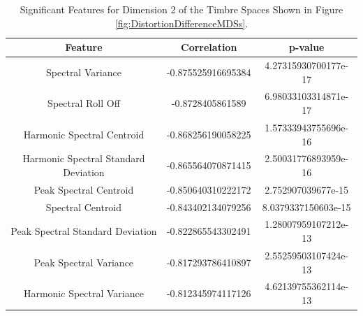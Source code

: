 	\begin{table}[h!]
		\centering
		\begin{tabular}{|c|c|c|}
			\hline
			\bf{Feature} & \bf{Correlation} & \bf{p-value} \\
			\hline
			\hline
			Spectral Variance & -0.875525916695384 & 4.27315930700177e-17 \\
			\hline
			Spectral Roll Off & -0.8728405861589 & 6.98033103314871e-17 \\
			\hline
			Harmonic Spectral Centroid & -0.868256190058225 & 1.57333943755696e-16 \\
			\hline
			Harmonic Spectral Standard Deviation & -0.865564070871415 & 2.50031776893959e-16 \\
			\hline
			Peak Spectral Centroid & -0.850640310222172 & 2.752907039677e-15 \\
			\hline
			Spectral Centroid & -0.843402134079256 & 8.0379337150603e-15 \\
			\hline
			Peak Spectral Standard Deviation & -0.822865543302491 & 1.28007959107212e-13 \\
			\hline
			Peak Spectral Variance & -0.817293786410897 & 2.55259503107424e-13 \\
			\hline
			Harmonic Spectral Variance & -0.812345974117126 & 4.62139755362114e-13 \\
			\hline
		\end{tabular}
		\caption{Significant Features for Dimension 2 of the Timbre Spaces Shown in Figure 
			 \ref{fig:DistortionDifferenceMDSs}.}
		\label{tab:DistortionDifferenceFeatures}
	\end{table}

